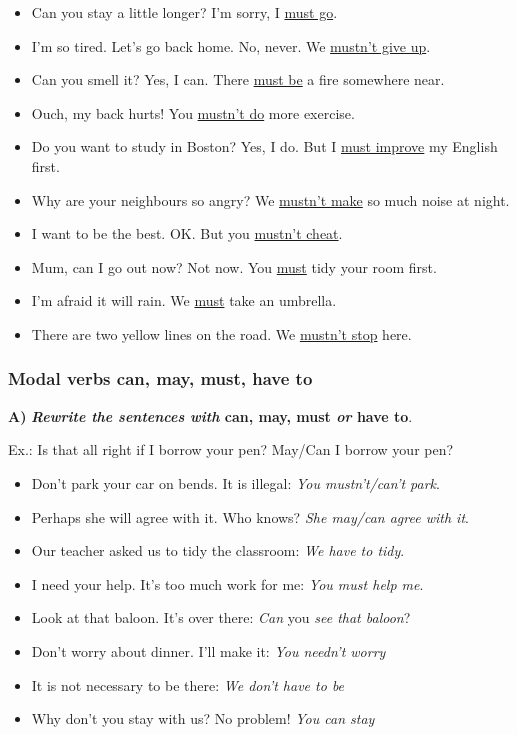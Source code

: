 \begin{itemize}

\item Can you stay a little longer? I'm sorry, I \underline{must go}.
\item I'm so tired. Let's go back home. No, never. We \underline{mustn't give up}.
\item Can you smell it? Yes, I can. There \underline{must be} a fire somewhere near. 
\item Ouch, my back hurts! You \underline{mustn't do} more exercise. 
\item Do you want to study in Boston? Yes, I do. But I \underline{must improve} my English first. 
\item Why are your neighbours so angry? We \underline{mustn't make} so much noise at night.
\item I want to be the best. OK. But you \underline{mustn't cheat}.
\item Mum, can I go out now? Not now. You \underline{must} tidy your room first. 
\item I'm afraid it will rain. We \underline{must} take an umbrella.
\item There are two yellow lines on the road. We \underline{mustn't stop} here.

\end{itemize}

\subsubsection{Modal verbs can, may, must, have to}

\textbf{A)} \textbf{\textit{Rewrite the sentences with} can, may, must \textit{or} have to}.

Ex.: Is that all right if I borrow your pen? May/Can I borrow your pen?

\begin{itemize}

\item Don't park your car on bends. It is illegal: \textit{You mustn't/can't park}.
\item Perhaps she will agree with it. Who knows? \textit{She may/can agree with it}.
\item Our teacher asked us to tidy the classroom: \textit{We have to tidy}.
\item I need your help. It's too much work for me: \textit{You must help me}.
\item Look at that baloon. It's over there: \textit{Can} you \textit{see that baloon}?
\item Don't worry about dinner. I'll make it: \textit{You needn't worry}
\item It is not necessary to be there: \textit{We don't have to be}
\item Why don't you stay with us? No problem! \textit{You can stay}

\end{itemize}

